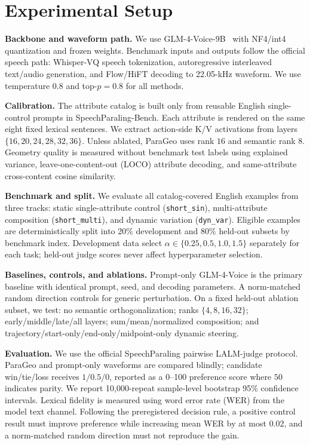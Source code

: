 \documentclass{article}
\begin{document}
\section{Experimental Setup}
\textbf{Backbone and waveform path.} We use GLM-4-Voice-9B~\cite{zeng2024glm4voice} with NF4/int4 quantization and frozen weights. Benchmark inputs and outputs follow the official speech path: Whisper-VQ speech tokenization, autoregressive interleaved text/audio generation, and Flow/HiFT decoding to 22.05-kHz waveform. We use temperature $0.8$ and top-$p=0.8$ for all methods.

\textbf{Calibration.} The attribute catalog is built only from reusable English single-control prompts in SpeechParaling-Bench. Each attribute is rendered on the same eight fixed lexical sentences. We extract action-side K/V activations from layers $\{16,20,24,28,32,36\}$. Unless ablated, ParaGeo uses rank $16$ and semantic rank $8$. Geometry quality is measured without benchmark test labels using explained variance, leave-one-content-out (LOCO) attribute decoding, and same-attribute cross-content cosine similarity.

\textbf{Benchmark and split.} We evaluate all catalog-covered English examples from three tracks: static single-attribute control (\texttt{short\_sin}), multi-attribute composition (\texttt{short\_multi}), and dynamic variation (\texttt{dyn\_var}). Eligible examples are deterministically split into 20\% development and 80\% held-out subsets by benchmark index. Development data select $\alpha\in\{0.25,0.5,1.0,1.5\}$ separately for each task; held-out judge scores never affect hyperparameter selection.

\textbf{Baselines, controls, and ablations.} Prompt-only GLM-4-Voice is the primary baseline with identical prompt, seed, and decoding parameters. A norm-matched random direction controls for generic perturbation. On a fixed held-out ablation subset, we test: no semantic orthogonalization; ranks $\{4,8,16,32\}$; early/middle/late/all layers; sum/mean/normalized composition; and trajectory/start-only/end-only/midpoint-only dynamic steering.

\textbf{Evaluation.} We use the official SpeechParaling pairwise LALM-judge protocol. ParaGeo and prompt-only waveforms are compared blindly; candidate win/tie/loss receives $1/0.5/0$, reported as a 0--100 preference score where $50$ indicates parity. We report 10,000-repeat sample-level bootstrap 95\% confidence intervals. Lexical fidelity is measured using word error rate (WER) from the model text channel. Following the preregistered decision rule, a positive control result must improve preference while increasing mean WER by at most $0.02$, and a norm-matched random direction must not reproduce the gain.
\end{document}
